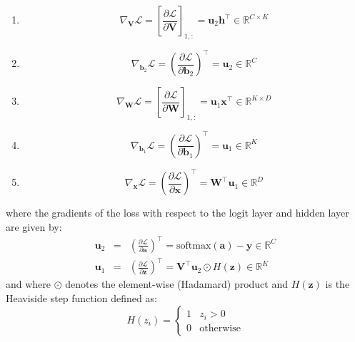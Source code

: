 \documentclass[11pt,twoside]{article}
\newcommand{\pts}[1]{\marginpar{ \small\hspace{0pt} \textit{[#1]} } }
\newcommand{\lt}{\left}
\newcommand{\rt}{\right}
\newcommand{\?}{\stackrel{?}{=}}
\newcommand{\pd}[2]{\frac{\partial{#1}}{\partial{#2}}}
\newcommand{\mc}{\mathcal}
\newcommand{\tr}{^{\bm\top}}
\begin{document}
\begin{enumerate}[\bf (a)]
  \item \pts{4} \begin{equation}
    \nabla_{\bm V} \mc L = \lt[ \pd{\mc L}{\bm V} \rt]_{1,:} = \bm u_2 \bm h\tr \in \mathbb{R}^{C\times K}
  \end{equation}
  \item \pts{4} \begin{equation}
    \nabla_{\bm b_2} \mc L = \lt( \pd{\mc L}{\bm b_2} \rt)\tr = \bm u_2 \in \mathbb{R}^{C}
  \end{equation}
  \item \pts{4} \begin{equation}
    \nabla_{\bm W} \mc L = \lt[ \pd{\mc L}{\bm W} \rt]_{1,:} = \bm u_1 \bm x\tr \in \mathbb{R}^{K\times D}
  \end{equation}
  \item \pts{4} \begin{equation}
    \nabla_{\bm b_1} \mc L = \lt( \pd{\mc L}{\bm b_1} \rt)\tr = \bm u_1 \in \mathbb{R}^{K}
  \end{equation}
  \item \pts{4} \begin{equation}
    \nabla_{\bm x} \mc L = \lt( \pd{\mc L}{\bm x} \rt)\tr = \bm W\tr \bm u_1 \in \mathbb{R}^{D}
  \end{equation}
\end{enumerate}
where the gradients of the loss with respect to the logit layer and hidden layer are given by:
\begin{eqnarray}
  \bm u_2 &=& \lt(\pd{\mc L}{\bm a}\rt)\tr = \text{softmax}(\bm a) - \bm y \in \mathbb{R}^C \\
  \bm u_1 &=& \lt(\pd{\mc L}{\bm z}\rt)\tr = \bm V\tr \bm u_2 \odot H(\bm z) \in \mathbb{R}^K
\end{eqnarray}
and where $\odot$ denotes the element-wise (Hadamard) product and $H(\bm z)$ is the Heaviside step function defined as:
\begin{equation}
  H(z_i) =
  \begin{cases}
    1 & z_i > 0 \\
    0 & \text{otherwise}
  \end{cases}
\end{equation}
\end{document}
